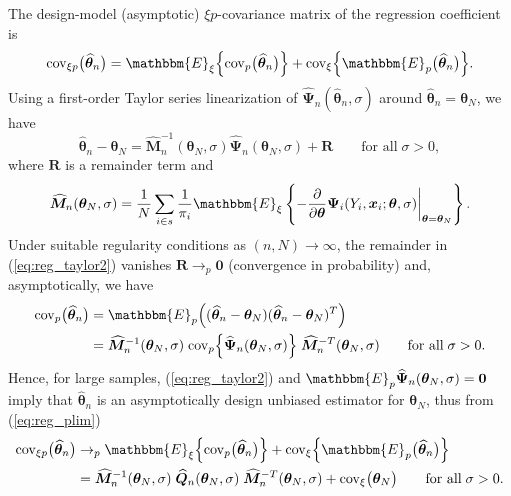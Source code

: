 \documentclass[a4paper,oneside,11pt,DIV=12]{scrartcl}
\theoremstyle{remark}
\begin{document}
The design-model (asymptotic) $\xi p$-covariance matrix of the regression coefficient is
\begin{equation}\label{eq:reg_total_cov}
    \mathrm{cov}_{\xi p}\big( \widehat{\bm \theta}_n \big) = \mathbbm{E}_{\xi} \Big\{ \mathrm{cov}_{p} \big( \widehat{\bm \theta}_n \big) \Big\}+ \mathrm{cov}_{\xi} \Big\{ \mathbbm{E}_p \big( \widehat{\bm \theta}_n\big) \Big\}.
\end{equation}
\noindent Using a first-order Taylor series linearization of $\widehat{\bm \Psi}_n(\widehat{\bm \theta}_n, \sigma)$ around $\widehat{\bm \theta}_n = \bm \theta_N$, we have \citep[see e.g.][]{binder_1983}
\begin{equation}\label{eq:reg_taylor2}
    \widehat{\bm \theta}_n - \bm \theta_N = \widehat{\bm M}_n^{-1}(\bm \theta_N, \sigma) \widehat{\bm \Psi}_n(\bm \theta_N, \sigma) + \bm R \qquad \text{for all} \; \sigma > 0,
\end{equation}
\noindent where $\bm R$ is a remainder term and
\begin{equation}
    \widehat{\bm M}_n(\bm \theta_N, \sigma) = \frac{1}{N}\sum_{i \in s} \frac{1}{\pi_i}\mathbbm{E}_{\xi} \left\{ -\frac{\partial}{\partial \bm \theta} \bm \Psi_i(Y_i, \bm x_i; \bm \theta, \sigma) \bigg\vert_{\bm \theta = \bm \theta_N}\right\}.
\end{equation}
\noindent Under suitable regularity conditions as $(n, N) \rightarrow \infty$, the remainder in (\ref{eq:reg_taylor2}) vanishes $\bm R \rightarrow_p \bm 0$ (convergence in probability) and, asymptotically, we have
\begin{align}\label{eq:reg_plim}
    \mathrm{cov}_{p} \big( \widehat{\bm \theta}_n \big) &= \mathbbm{E}_p \Big( (\widehat{\bm \theta}_n - \bm \theta_N) (\widehat{\bm \theta}_n - \bm \theta_N)^T \Big) \nonumber \\
    & = \widehat{\bm M}_n^{-1}(\bm \theta_N, \sigma) \; \mathrm{cov}_p\Big\{\widehat{\bm \Psi}_n(\bm \theta_N, \sigma) \Big\} \; \widehat{\bm M}_n^{-T}(\bm \theta_N, \sigma) \qquad \text{for all} \; \sigma > 0.
\end{align}
\noindent Hence, for large samples, (\ref{eq:reg_taylor2}) and $\mathbbm{E}_p \widehat{\bm \Psi}_n(\bm \theta_N, \sigma) = \bm 0$ imply that $\widehat{\bm \theta}_n$ is an asymptotically design unbiased estimator for $\bm \theta_N$, thus from (\ref{eq:reg_plim})
\begin{align*}
    \mathrm{cov}_{\xi p}\big( \widehat{\bm \theta}_n \big) & \rightarrow_p \mathbbm{E}_{\xi} \Big\{ \mathrm{cov}_{p} \big( \widehat{\bm \theta}_n\big) \Big\} + \mathrm{cov}_{\xi} \Big\{ \mathbbm{E}_p \big( \widehat{\bm \theta}_n\big) \Big\} \\
    & =  \widehat{\bm M}_n^{-1}(\bm \theta_N, \sigma) \; \widehat{\bm Q}_n(\bm \theta_N, \sigma) \; \widehat{\bm M}_n^{-T}(\bm \theta_N, \sigma) +\mathrm{cov}_{\xi} \big( \bm \theta_N \big) \qquad \text{for all} \; \sigma > 0.
\end{align*}
\end{document}

